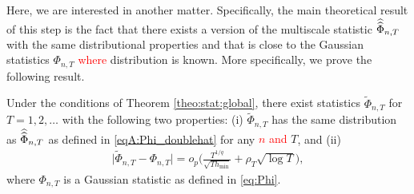 Here, we are interested in another matter. Specifically, the main theoretical result of this step is the fact that there exists a version of the multiscale statistic $\widehat{\widehat{\Phi}}_{n,T}$ with the same distributional properties and that is close to the Gaussian statistics $\Phi_{n,T}$ \textcolor{red}{where} distribution is known. More specifically, we prove the following result. 

\begin{propA}\label{propA:strong_approx}
Under the conditions of Theorem \ref{theo:stat:global}, there exist statistics $\widetilde{\Phi}_{n,T}$ for $T = 1,2,\ldots$ with the following two properties: (i) $\widetilde{\Phi}_{n, T}$ has the same distribution as $\widehat{\widehat{\Phi}}_{n, T}$ as defined in \eqref{eqA:Phi_doublehat} for any \textcolor{red}{$n$ and } $T$, and (ii)
\begin{align}\label{eq-strong-approx-equality}
\big| \widetilde{\Phi}_{n, T} - \Phi_{n,T} \big| = o_p \Big( \frac{T^{1/q}}{\sqrt{T h_{\min}}} + \rho_T\sqrt{\log T} \Big),
\end{align}
where $\Phi_{n,T}$ is a Gaussian statistic as defined in \eqref{eq:Phi}. 
\end{propA}
